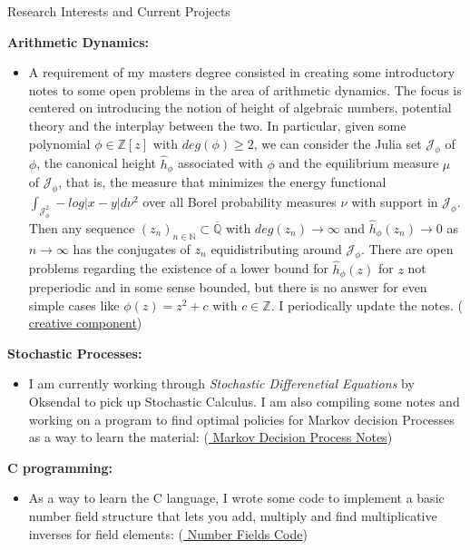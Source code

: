 \documentclass{resume} %
\newcommand{\N}{\mathbb{N}}
\newcommand{\Z}{\mathbb{Z}}
\newcommand{\Q}{\mathbb{Q}}
\newcommand{\MJ}{\mathcal{J}}
\begin{document}
\begin{rSection}{Research Interests and Current Projects}

{\bf Arithmetic Dynamics:}  
\begin{itemize}
\item A requirement of my masters degree consisted in creating some introductory notes to some open problems in the area of arithmetic dynamics. The focus is centered on introducing the notion of height of algebraic numbers,  potential theory and the interplay between the two. In particular, given some polynomial $\phi \in \Z[z]$ with $deg(\phi) \geq 2$, we can consider the Julia set $\MJ_{\phi}$ of $\phi$, the canonical height $\hat{h}_\phi$ associated with $\phi$ and the equilibrium measure $\mu$ of $\MJ_{\phi}$, that is, the measure that minimizes the energy functional $\int_{\MJ_{\phi}^2}-log|x-y|d\nu^2$ over all Borel probability measures $\nu$ with support in $\MJ_{\phi}$. Then any sequence $(z_n)_{n \in \N} \subset \overline{\Q}$ with $deg(z_n) \rightarrow \infty$ and $\hat{h}_{\phi}(z_n) \rightarrow 0$ as $n \rightarrow \infty$ has the conjugates of $z_n$ equidistributing around $\MJ_\phi$. There are open problems regarding the existence of a lower bound for $\hat{h}_{\phi}(z)$ for $z$ not preperiodic and in some sense bounded, but there is no answer for even simple cases like $\phi(z) = z^2+c$ with $c \in \Z$. I periodically update the notes. (\href{https://github.com/carsonaj/Math/blob/master/Arithmetic%20Dynamics/Arithmetic%20Dynamics%20Notes.pdf}{{\color{blue} creative component}})
\end{itemize}

{\bf Stochastic Processes:}
\begin{itemize}
\item I am currently working through \textit{Stochastic Differenetial Equations} by Oksendal to pick up Stochastic Calculus. I am also compiling some notes and working on a program to find optimal policies for Markov decision Processes as a way to learn the material: (\href{https://github.com/carsonaj/Math/blob/master/Optimization/Markov%20Decision%20Processes.pdf}{{\color{blue} Markov Decision Process Notes}})
\end{itemize}

{\bf C programming:}
\begin{itemize}
\item As a way to learn the C language, I wrote some code to implement a basic number field structure that lets you add, multiply and find multiplicative inverses for field elements: (\href{https://github.com/carsonaj/number-fields}{{\color{blue} Number Fields Code}})
\end{itemize}


\end{rSection}
\end{document}
